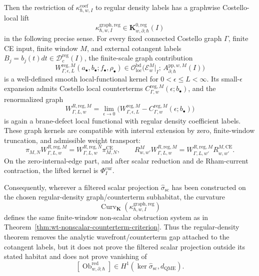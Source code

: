 \begin{prop}
  Then the restriction of
  \(\kappa^{\mathrm{coef}}_{\hbar,w,I}\) to regular density labels has a
  graphwise Costello-local lift
  \[
    \kappa^{\mathrm{graph,reg}}_{\hbar,w,I}
      \in
      \mathbf K^{0,\mathrm{reg}}_{w,\partial,\hbar}(I)
  \]
  in the following precise sense.
  For every fixed connected Costello graph \(\Gamma\), finite CE input,
  finite window \(M\), and external cotangent labels
  \(B_j=b_j(t)dt\in\mathcal D^{\mathrm{reg}}_c(I)\), the finite-scale graph
  contribution
  \[
    W^{\mathrm{reg},M}_{\Gamma,\epsilon,L}
      (a_\bullet,b_\bullet;f_\bullet,\rho_\bullet)
      \in
      \mathcal O_{\mathrm{loc}}^{\mathrm{bd}}\bigl(
        \mathcal E_w^M|_I;\,
        A_{\partial,\hbar}^{\mathrm{pp},w,M}(I)\bigr)
  \]
  is a well-defined smooth local-functional kernel for
  \(0<\epsilon\leq L<\infty\).  Its small-\(\epsilon\) expansion admits
  Costello local counterterms
  \(C_{\Gamma,w}^{\mathrm{reg},M}(\epsilon;b_\bullet)\), and the
  renormalized graph
  \[
    W^{R,\mathrm{reg},M}_{\Gamma,L,w}
      =
      \lim_{\epsilon\to0}
      \bigl(
        W^{\mathrm{reg},M}_{\Gamma,\epsilon,L}
        -
        C_{\Gamma,w}^{\mathrm{reg},M}(\epsilon;b_\bullet)
      \bigr)
  \]
  is again a brane-defect local functional with regular density
  coefficient labels.  These graph kernels are compatible with interval
  extension by zero, finite-window truncation, and admissible weight
  transport:
  \[
    \pi_{M,N}W^{R,\mathrm{reg},M}_{\Gamma,L,w}
      =
      W^{R,\mathrm{reg},N}_{\Gamma,L,w}\pi^{\mathrm{CE}}_{M,N},
    \qquad
    R^M_{w,w'}W^{R,\mathrm{reg},M}_{\Gamma,L,w}
      =
      W^{R,\mathrm{reg},M}_{\Gamma,L,w'}R^{M,\mathrm{CE}}_{w,w'} .
  \]
  On the zero-internal-edge part, and after scalar reduction and
  de Rham-current contraction, the lifted kernel is
  \(\Phi_I^{\mathrm{cur}}\).

  Consequently, wherever a filtered scalar projection
  \(\widehat\sigma_{\mathrm{sc}}\) has been constructed on the chosen
  regular-density graph/counterterm subhabitat, the curvature
  \[
    \operatorname{Curv}_{\mathbf K}
      (\kappa^{\mathrm{graph,reg}}_{\hbar,w,I})
  \]
  defines the same finite-window non-scalar obstruction system as in
  Theorem~\ref{thm:wt-nonscalar-counterterm-criterion}.  Thus the
  regular-density theorem removes the analytic wavefront/counterterm gap
  attached to the cotangent labels, but it does not prove the filtered
  scalar projection outside its stated habitat and does not prove
  vanishing of
  \[
    [\operatorname{Ob}^{\mathrm{red}}_{w,\partial,\hbar}]
      \in
      H^1(\ker\widehat\sigma_{\mathrm{sc}},d_{\mathrm{QME}}).
  \]


\end{prop}
